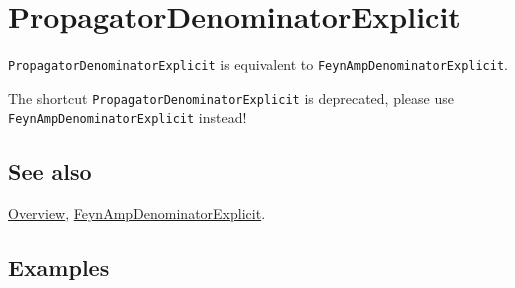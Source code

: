 \documentclass[../FeynCalcManual.tex]{subfiles}
\begin{document}
\hypertarget{propagatordenominatorexplicit}{%
\section{PropagatorDenominatorExplicit}\label{propagatordenominatorexplicit}}

\texttt{PropagatorDenominatorExplicit} is equivalent to
\texttt{FeynAmpDenominatorExplicit}.

The shortcut \texttt{PropagatorDenominatorExplicit} is deprecated,
please use \texttt{FeynAmpDenominatorExplicit} instead!

\subsection{See also}

\hyperlink{toc}{Overview},
\hyperlink{feynampdenominatorexplicit}{FeynAmpDenominatorExplicit}.

\subsection{Examples}
\end{document}
